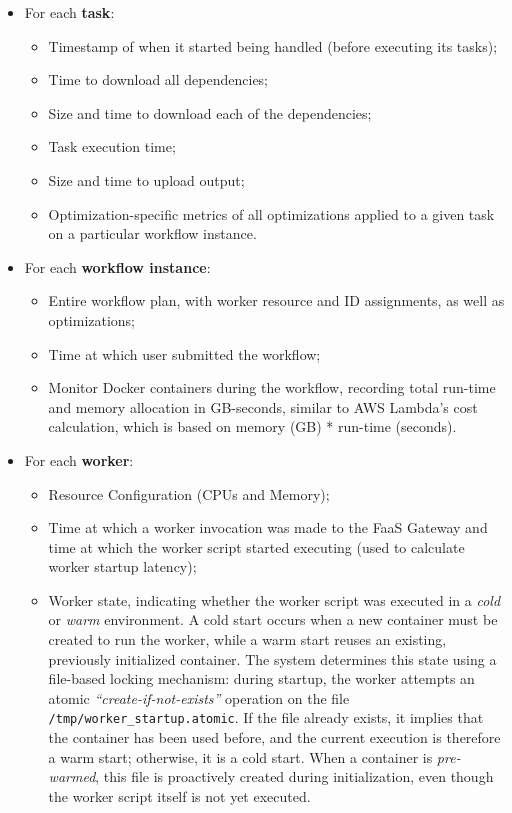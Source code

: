 \begin{itemize}
    \item For each \textbf{task}:
    \begin{itemize}
        \item Timestamp of when it started being handled (before executing its tasks);
        \item Time to download all dependencies;
        \item Size and time to download each of the dependencies;
        \item Task execution time;
        \item Size and time to upload output;
        \item Optimization-specific metrics of all optimizations applied to a given task on a particular workflow instance.
    \end{itemize}
    \item For each \textbf{workflow instance}:
    \begin{itemize}
        \item Entire workflow plan, with worker resource and ID assignments, as well as optimizations;
        \item Time at which user submitted the workflow;
        \item Monitor Docker containers during the workflow, recording total run-time and memory allocation in GB-seconds, similar to AWS Lambda's cost calculation, which is based on memory (GB) * run-time (seconds).
    \end{itemize}
    \item For each \textbf{worker}:
    \begin{itemize}
        \item Resource Configuration (CPUs and Memory);
        \item Time at which a worker invocation was made to the FaaS Gateway and time at which the worker script started executing (used to calculate worker startup latency);
        \item Worker state, indicating whether the worker script was executed in a \textit{cold} or \textit{warm} environment. A cold start occurs when a new container must be created to run the worker, while a warm start reuses an existing, previously initialized container. The system determines this state using a file-based locking mechanism: during startup, the worker attempts an atomic \textit{“create-if-not-exists”} operation on the file \texttt{/tmp/worker\_startup.atomic}. If the file already exists, it implies that the container has been used before, and the current execution is therefore a warm start; otherwise, it is a cold start. When a container is \textit{pre-warmed}, this file is proactively created during initialization, even though the worker script itself is not yet executed.
    \end{itemize}
\end{itemize}

